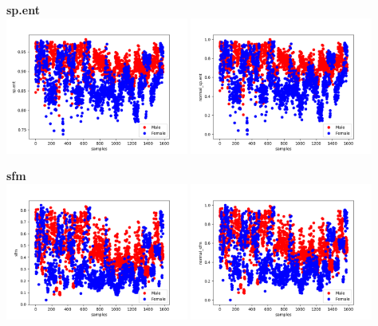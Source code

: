 \documentclass[12pt]{article}
\begin{document}
\begin{justify}
			\textbf{sp.ent}\\
				\includegraphics[width=6cm]{../Graphs2/sp_ent.png}
				\includegraphics[width=6cm]{../Graphs2/norm_sp_ent.png}	
				
			\textbf{sfm}\\
				\includegraphics[width=6cm]{../Graphs2/sfm}
				\includegraphics[width=6cm]{../Graphs2/norm_sfm}	
				

\end{justify}
\end{document}
